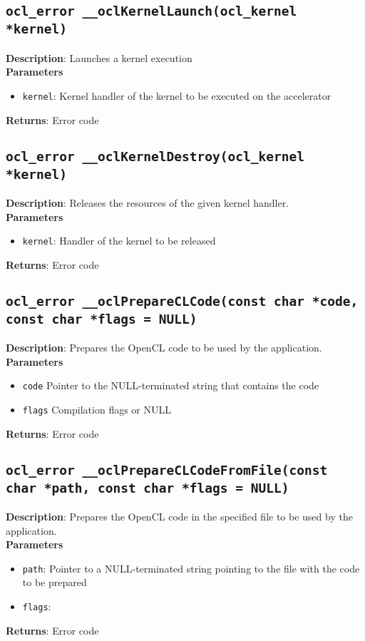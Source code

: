 \subsection{\texttt{ocl\_error \_\_oclKernelLaunch(ocl\_kernel *kernel)}}

\textbf{Description}: Launches a kernel execution\\
\textbf{Parameters}
\begin{itemize}
  \item \texttt{kernel}: Kernel handler of the kernel to be executed on the accelerator
\end{itemize}
\textbf{Returns}: Error code

\subsection{\texttt{ocl\_error \_\_oclKernelDestroy(ocl\_kernel *kernel)}}

\textbf{Description}: Releases the resources of the given kernel handler. \\
\textbf{Parameters}
\begin{itemize}
  \item \texttt{kernel}: Handler of the kernel to be released
\end{itemize}
\textbf{Returns}: Error code


\subsection{\texttt{ocl\_error \_\_oclPrepareCLCode(const char *code, const char *flags = NULL)}}

\textbf{Description}: Prepares the OpenCL code to be used by the application. \\
\textbf{Parameters}
\begin{itemize}
  \item \texttt{code} Pointer to the NULL-terminated string that contains the code
  \item \texttt{flags} Compilation flags or NULL
\end{itemize}
\textbf{Returns}: Error code

\subsection{\texttt{ocl\_error \_\_oclPrepareCLCodeFromFile(const char *path, const char *flags = NULL)}}

\textbf{Description}: Prepares the OpenCL code in the specified file to be used by the application.  \\
\textbf{Parameters}
\begin{itemize}
  \item \texttt{path}: Pointer to a NULL\hyp{}terminated string pointing to the file with the code 
 to be prepared
  \item \texttt{flags}: \end{itemize}
\textbf{Returns}: Error code

